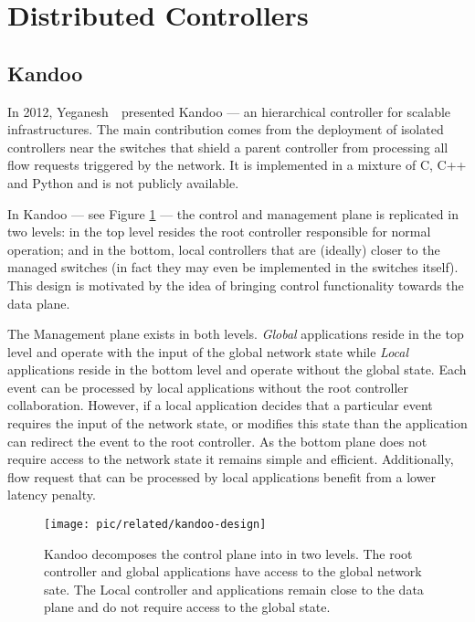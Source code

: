 \glsresetall
\section{Distributed Controllers}
\label{sec:related:distr-contr}

\subsection{Kandoo}
\label{sec:related:kandoo}
In 2012, Yeganesh~\etal\ presented Kandoo \cite{Yeganeh:2012jm}  --- an hierarchical controller for scalable infrastructures. 
The main contribution comes from the deployment of isolated controllers near the switches that shield a parent  controller from processing all
flow requests triggered by the network. 
It is implemented in a mixture of
C, C++ and Python and is not publicly available. 

In Kandoo --- see Figure  \ref{fig:kandoo-design} --- the control and management plane is replicated in two levels: in the top level resides the root controller responsible for normal operation; and in the bottom, local controllers that are (ideally) closer to the managed switches (in fact they may even be implemented in the switches itself). 
This design is motivated by the idea of bringing control functionality towards the data plane. 


The Management plane exists in both levels. 
\emph{Global} applications reside in the top level and operate with the input of the global network state while \emph{Local} applications reside in the bottom level and operate without the global state. 
Each event can be processed by local applications without the root controller collaboration. 
However, if a local application decides that a particular event requires the input of the network state, or modifies this state than the application can redirect the event to the root controller. 
As the bottom plane does not require access to the network state it remains simple and efficient. 
Additionally, flow request that can be processed by local applications benefit from a lower latency penalty. 


\begin{figure}
  \centering 
\texttt{[image: pic/related/kandoo-design]}
  \caption[Kandoo design] {Kandoo decomposes the control plane into 
in two levels. The root controller and global applications have access to the global network sate.  The Local controller and applications remain close to the data plane and do not require access to the global state.} 
  \label{fig:kandoo-design}
\end{figure}

